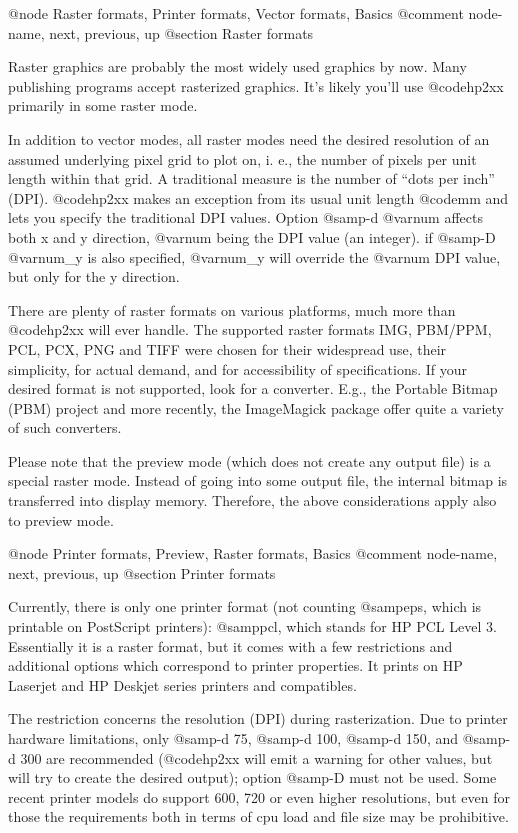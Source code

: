@node Raster formats, Printer formats, Vector formats, Basics
@comment  node-name,  next,  previous,  up
@section Raster formats

Raster graphics are probably the most widely used graphics by now.
Many publishing programs accept rasterized graphics. It's likely you'll
use @code{hp2xx} primarily in some raster mode.

In addition to vector modes, all raster modes need the desired resolution
of an assumed underlying pixel grid to plot on, i. e., the number of
pixels per unit length within that grid.
A traditional measure is the number of ``dots per inch'' (DPI).
@code{hp2xx} makes an exception from its usual unit length @code{mm} and
lets you specify the traditional DPI values.
Option @samp{-d @var{num}} affects both x and y direction, @var{num} being
the DPI value (an integer). if @samp{-D @var{num_y}} is also specified,
@var{num_y} will override the @var{num} DPI value, but only for the y
direction.

There are plenty of raster formats on various platforms, much more
than @code{hp2xx} will ever handle. The supported raster formats
IMG, PBM/PPM, PCL, PCX, PNG and TIFF were chosen for their widespread use, their simplicity,
for actual demand, and for accessibility of specifications.
If your desired format is not supported, look for a converter. E.g., the
Portable Bitmap (PBM) project and more recently, the ImageMagick package 
offer quite a variety of such converters.

Please note that the preview mode (which does not create any output file)
is a special raster mode. Instead of going into some output file,
the internal bitmap is transferred into display memory.
Therefore, the above considerations apply also to preview mode.




@node Printer formats, Preview, Raster formats, Basics
@comment  node-name,  next,  previous,  up
@section Printer formats

Currently, there is only one printer format (not counting @samp{eps}, which
is printable on PostScript printers): @samp{pcl}, which stands for HP PCL
Level 3. Essentially it is a raster format, but it comes with a few
restrictions and additional options which correspond to printer properties.
It prints on HP Laserjet and HP Deskjet series printers and compatibles.

The restriction concerns the resolution (DPI) during rasterization. Due to
printer hardware limitations, only @samp{-d 75}, @samp{-d 100}, @samp{-d 150},
and @samp{-d 300} are recommended (@code{hp2xx} will emit a warning for other
values, but will try to create the desired output); option @samp{-D} must not 
be used. Some recent printer models do support 600, 720 or even higher
resolutions, but even for those the requirements both in terms of cpu load
and file size may be prohibitive.

